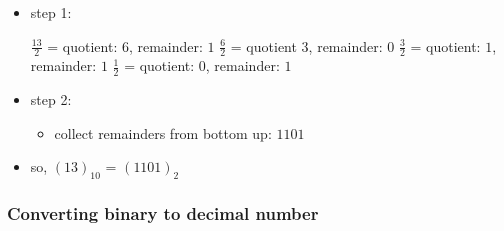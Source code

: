 \documentclass[11pt]{article}
\providecommand{\tightlist}{%
      \setlength{\itemsep}{0pt}\setlength{\parskip}{0pt}}
\begin{document}
\begin{itemize}
  \begin{itemize}
  \item
    step 1:

    \(\frac{13}{2}\) = quotient: \(6\), remainder: \(1\) \(\frac{6}{2}\)
    = quotient \(3\), remainder: \(0\) \(\frac{3}{2}\) = quotient:
    \(1\), remainder: \(1\) \(\frac{1}{2}\) = quotient: \(0\),
    remainder: \(1\)
  \item
    step 2:

    \begin{itemize}
    \tightlist
    \item
      collect remainders from bottom up: \(1101\)
    \end{itemize}
  \item
    so, \((13)_{10}\) = \((1101)_2\)
  \end{itemize}
\end{itemize}

\hypertarget{converting-binary-to-decimal-number}{%
\subsubsection{Converting binary to decimal
number}\label{converting-binary-to-decimal-number}}
\end{document}

